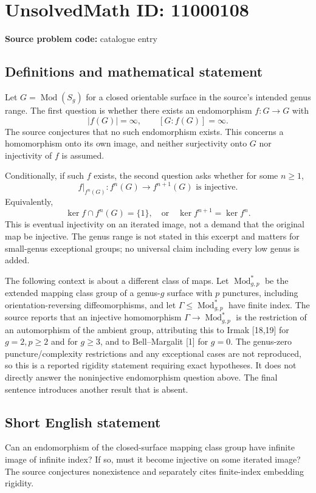 \documentclass[11pt]{article}
\begin{document}
\section*{UnsolvedMath ID: 11000108}
\textbf{Source problem code:} catalogue entry
\subsection{Definitions and mathematical statement}
Let \(G=\operatorname{Mod}(S_g)\) for a closed orientable surface in the source's intended genus range. The first question is whether there exists an endomorphism \(f:G\to G\) with
\[|f(G)|=\infty,\qquad [G:f(G)]=\infty.\]
The source conjectures that no such endomorphism exists. This concerns a homomorphism onto its own image, and neither surjectivity onto \(G\) nor injectivity of \(f\) is assumed.

Conditionally, if such \(f\) exists, the second question asks whether for some \(n\geq1\),
\[f|_{f^n(G)}:f^n(G)\to f^{n+1}(G)\text{ is injective}.\]
Equivalently,
\[\ker f\cap f^n(G)=\{1\},\quad\text{or}\quad\ker f^{n+1}=\ker f^n.\]
This is eventual injectivity on an iterated image, not a demand that the original map be injective. The genus range is not stated in this excerpt and matters for small-genus exceptional groups; no universal claim including every low genus is added.

The following context is about a different class of maps. Let \(\operatorname{Mod}_{g,p}^*\) be the extended mapping class group of a genus-\(g\) surface with \(p\) punctures, including orientation-reversing diffeomorphisms, and let \(\Gamma\leq\operatorname{Mod}_{g,p}^*\) have finite index. The source reports that an injective homomorphism \(\Gamma\to\operatorname{Mod}_{g,p}^*\) is the restriction of an automorphism of the ambient group, attributing this to Irmak [18,19] for \(g=2,p\geq2\) and for \(g\geq3\), and to Bell--Margalit [1] for \(g=0\). The genus-zero puncture/complexity restrictions and any exceptional cases are not reproduced, so this is a reported rigidity statement requiring exact hypotheses. It does not directly answer the noninjective endomorphism question above. The final sentence introduces another result that is absent.
\subsection{Short English statement}
Can an endomorphism of the closed-surface mapping class group have infinite image of infinite index? If so, must it become injective on some iterated image? The source conjectures nonexistence and separately cites finite-index embedding rigidity.
\end{document}
